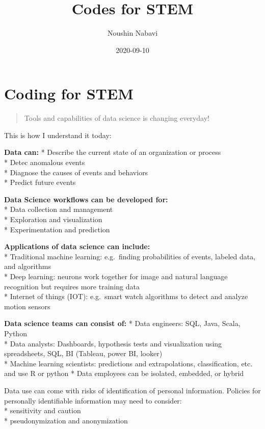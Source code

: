 \documentclass[]{book}
\title{Codes for STEM}
\author{Noushin Nabavi}
\date{2020-09-10}
\begin{document}
\maketitle

{
\setcounter{tocdepth}{1}
\tableofcontents
}
\hypertarget{coding-for-stem}{%
\chapter{Coding for STEM}\label{coding-for-stem}}

\begin{quote}
Tools and capabilities of data science is changing everyday!
\end{quote}

This is how I understand it today:

\textbf{Data can:}
* Describe the current state of an organization or process\\
* Detec anomalous events\\
* Diagnose the causes of events and behaviors\\
* Predict future events

\textbf{Data Science workflows can be developed for: }\\
* Data collection and management\\
* Exploration and visualization\\
* Experimentation and prediction

\textbf{Applications of data science can include: }\\
* Traditional machine learning: e.g.~finding probabilities of events, labeled data, and algorithms\\
* Deep learning: neurons work together for image and natural language recognition but requires more training data\\
* Internet of things (IOT): e.g.~smart watch algorithms to detect and analyze motion sensors

\textbf{Data science teams can consist of:}
* Data engineers: SQL, Java, Scala, Python\\
* Data analysts: Dashboards, hypothesis tests and visualization using spreadsheets, SQL, BI (Tableau, power BI, looker)\\
* Machine learning scientists: predictions and extrapolations, classification, etc. and use R or python * Data employees can be isolated, embedded, or hybrid

Data use can come with risks of identification of personal information. Policies for personally identifiable information may need to consider:\\
* sensitivity and caution\\
* pseudonymization and anonymization
\end{document}
